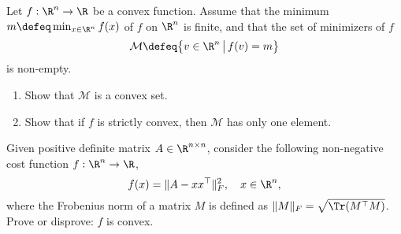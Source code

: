 \documentclass[11pt,nocut]{article}
\begin{document}
\vspace{5mm}


\begin{problem}[2 points]
	Let $f: \R^n \to \R$ be a convex function. Assume that the minimum $m \defeq \min_{x \in \R^n} f(x)$ of $f$ on $\R^n$ is finite, and that the set of minimizers of $f$
	$$
	\mathcal{M} \defeq \big\{ v \in \R^n \, \big| \, f(v) = m \big\}
	$$
	is non-empty.
	
	\begin{enumerate}[label=\normalfont(\textbf{\alph*})]
		\item Show that $\mathcal{M}$ is a convex set.
		\item Show that if $f$ is strictly convex, then $\mathcal{M}$ has only one element.
	\end{enumerate}
\end{problem}


\vspace{5mm}


\begin{problem}[*]
Given positive definite matrix $A\in\R^{n\times n}$, consider the following non-negative cost function $f: \R^n\to\R$,
$$
f(x) = \|A - xx^\top\|_F^2, \quad x\in\R^n, 
$$
where the Frobenius norm of a matrix $M$ is defined as $\|M\|_F = \sqrt{\Tr(M^\top M)}$. \\
Prove or disprove: $f$ is convex. 
\end{problem}
\end{document}
